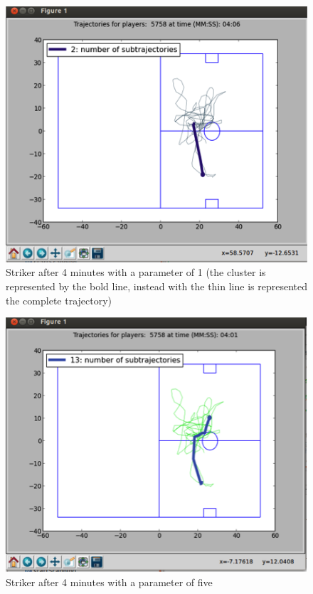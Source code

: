 \documentclass{acm_proc_article-sp-sigmod07}
\begin{document}
\begin{figure}
\includegraphics{experimental1}
\caption{Striker after 4 minutes with a parameter of 1 (the cluster is represented by the bold line,  instead with the thin line is represented the complete trajectory)}
\end{figure}

\begin{figure}
\includegraphics{experimental2}
\caption{Striker after 4 minutes with a parameter of five}
\end{figure}
\end{document}
